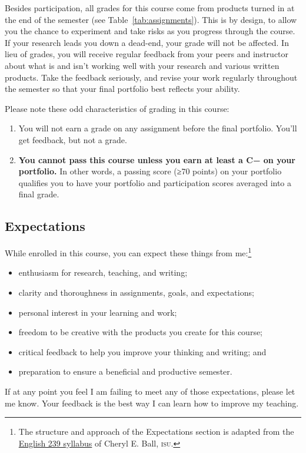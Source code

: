 \documentclass[11pt,oneside]{amsart}	%
\begin{document}
Besides participation, all grades for this course come from products turned in at the end of the semester (see Table~\ref{tab:assignments}). This is by design, to allow you the chance to experiment and take risks as you progress through the course. If your research leads you down a dead-end, your grade will not be affected. In lieu of grades, you will receive regular feedback from your peers and instructor about what is and isn't working well with your research and various written products. Take the feedback seriously, and revise your work regularly throughout the semester so that your final portfolio best reflects your ability.

Please note these odd characteristics of grading in this course:
\begin{enumerate}
	\item You will not earn a grade on any assignment before the final portfolio. You'll get feedback, but not a grade.
	\item \textbf{You cannot pass this course unless you earn at least a C− on your portfolio.} In other words, a passing score (≥70 points) on your portfolio qualifies you to have your portfolio and participation scores averaged into a final grade.
\end{enumerate}



\subsection{Expectations} %
\label{sub:expectations}

While enrolled in this course, you can expect these things from me:\footnote{The structure and approach of the Expectations section is adapted from the \href{http://www.ceball.com/classes/239/spring09/?page_id=8}{English 239 syllabus} of Cheryl E. Ball, \textsc{isu}.}
\begin{itemize}
	\item enthusiasm for research, teaching, and writing;
	\item clarity and thoroughness in assignments, goals, and expectations;
	\item personal interest in your learning and work;
	\item freedom to be creative with the products you create for this course;
	\item critical feedback to help you improve your thinking and writing; and
	\item preparation to ensure a beneficial and productive semester.
\end{itemize}
If at any point you feel I am failing to meet any of those expectations, please let me know. Your feedback is the best way I can learn how to improve my teaching.
\end{document}
